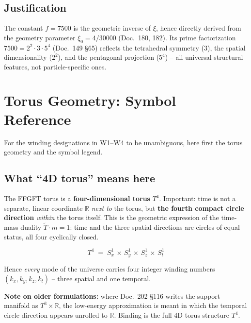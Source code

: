 \subsection*{Justification}

The constant $f = 7500$ is the geometric inverse of $\xi$, hence
directly derived from the geometry parameter $\xi_0 = 4/30000$
(Doc.~180, 182). Its prime factorization
$7500 = 2^2 \cdot 3 \cdot 5^4$ (Doc.~149 §65) reflects the tetrahedral
symmetry ($3$), the spatial dimensionality ($2^2$), and the pentagonal
projection ($5^4$) -- all universal structural features, not
particle-specific ones.

\section{Torus Geometry: Symbol Reference}

For the winding designations in W1--W4 to be unambiguous, here first
the torus geometry and the symbol legend.

\subsection*{What \enquote{4D torus} means here}

The FFGFT torus is a \textbf{four-dimensional torus} $T^4$.
Important: time is not a separate, linear coordinate $\mathbb{R}$
\emph{next to} the torus, but \textbf{the fourth compact circle
direction} \emph{within} the torus itself. This is the geometric
expression of the time-mass duality $\tilde T \cdot m = 1$: time and
the three spatial directions are circles of equal status, all four
cyclically closed.

\begin{equation}
  T^4 \;=\; S^1_x \,\times\, S^1_y \,\times\, S^1_z \,\times\, S^1_t
  \tag{210.0}
\end{equation}

Hence \emph{every} mode of the universe carries four integer winding
numbers $(k_x, k_y, k_z, k_t)$ -- three spatial and one temporal.

\textbf{Note on older formulations:} where Doc.~202 §116 writes the
support manifold as $T^3 \times \mathbb{R}$, the low-energy
approximation is meant in which the temporal circle direction
appears unrolled to $\mathbb{R}$. Binding is the full 4D torus
structure $T^4$.

